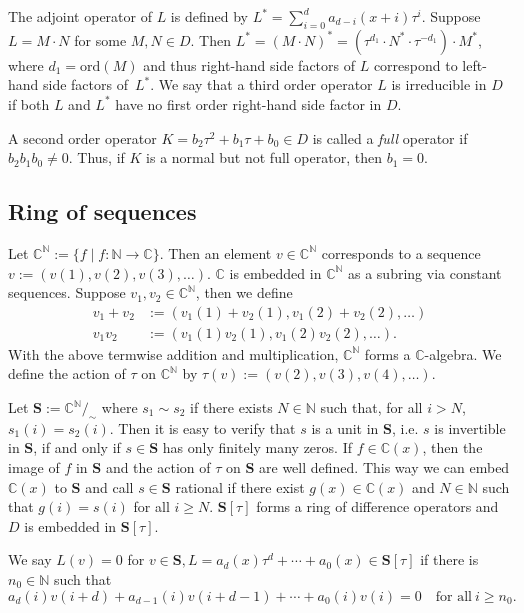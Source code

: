 \documentclass{article}
\newcommand{\C}{{\mathbb{C}}} \newcommand{\N}{{\mathbb{N}}}
\newcommand{\ord}{\mathrm{ord}}
\newcommand{\Seq}{\mathbf{S}}
\begin{document}
The adjoint operator of $L$ is defined by $L^* = \sum_{i=0}^d a_{d-i}(x+i)\tau^i$.
Suppose $L=M\cdot N$ for some $M, N \in D$.  Then $L^*=(M\cdot N)^*=(\tau^{d_1}\cdot
N^*\cdot \tau^{-d_1})\cdot M^*$, where $d_1=\ord(M)$ and thus right-hand side factors of $L$
correspond to left-hand side factors of~$L^*$. We say that a third order operator $L$ is
irreducible in $D$ if both $L$ and $L^*$ have no first order right-hand side factor in $D$.

A second order operator $K=b_2\tau^2+b_1\tau+b_0 \in D$ is called a {\em
    full} operator if $b_2b_1b_0 \neq 0 $.  Thus, if $K$ is a normal but not full
  operator, then $b_1=0$.  





\subsection{Ring of sequences}

Let $\C^\N:=\{ f \mid f:\N \rightarrow \C\}$. Then an element $v \in \C^\N$
  corresponds to a sequence $v:=(v(1), v(2), v(3), \ldots)$. $\C$ is embedded in $\C^\N$
  as a subring via constant sequences.  Suppose $v_1, v_2 \in \C^\N$, then we define
\begin{equation*}
\begin{split}
v_1+v_2&:=(v_1(1)+v_2(1), v_1(2)+v_2(2), \ldots ) \\
 v_1v_2&:=(v_1(1)v_2(1), v_1(2)v_2(2), \ldots ).
\end{split}
\end{equation*}
With the above termwise addition and multiplication, $\C^\N$ forms a $\C$-algebra.  We
define the action of $\tau$ on $\C^\N$ by $\tau(v):=(v(2), v(3), v(4), \ldots)$.

Let $\mathbf{S} := \C^{\N}/_\sim$ where $s_1 \sim s_2$ if there exists $N \in \N$ such
that, for all $i > N$, $s_1(i) = s_2(i)$.  Then it is easy to verify that $s$ is a unit in
$\Seq$, i.e. $s$ is invertible in $\Seq$, if and only if $s \in \Seq$ has only finitely
many zeros.  If $f \in \C(x)$, then the image of $f$ in $\Seq$ and the action of $\tau$ on
$\Seq$ are well defined. This way we can embed $\C(x)$ to $\Seq$ and call $s \in \Seq$
rational if there exist $g(x) \in \C(x)$ and $N \in \N$ such that $g(i)=s(i)$ for all $i
\geq N$.  $\Seq[\tau]$ forms a ring of difference operators and $D$ is embedded in
$\Seq[\tau]$.


We say $L(v)=0$ for $v \in \Seq, L=a_d(x)\tau^d+\cdots+a_0(x) \in \Seq[\tau]$ if there is $n_0 \in \N$ such that
$$a_d(i)v(i+d)+a_{d-1}(i)v(i+d-1)+\cdots+a_0(i)v(i)=0 \quad \text{for \ all} \ i \geq n_0.$$
\end{document}
